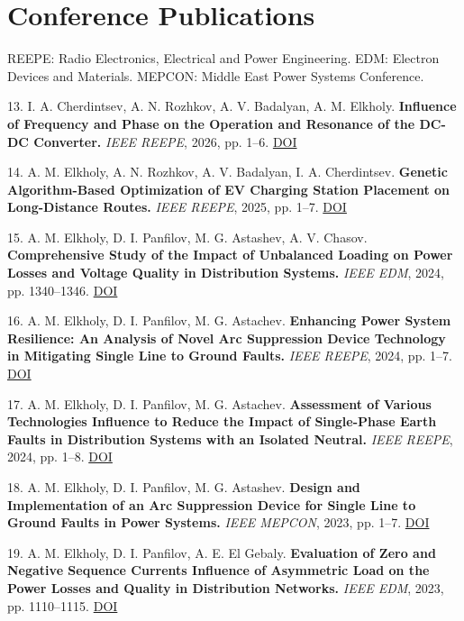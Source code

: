 \documentclass[10pt,a4paper]{article}
\begin{document}
\section*{Conference Publications}
REEPE: Radio Electronics, Electrical and Power Engineering. EDM: Electron Devices and Materials. MEPCON: Middle East Power Systems Conference.\par
13. I. A. Cherdintsev, A. N. Rozhkov, A. V. Badalyan, A. M. Elkholy. \textbf{Influence of Frequency and Phase on the Operation and Resonance of the DC-DC Converter.} \textit{IEEE REEPE}, 2026, pp. 1–6. \href{https://doi.org/10.1109/reepe69046.2026.11481435}{DOI}\par
14. A. M. Elkholy, A. N. Rozhkov, A. V. Badalyan, I. A. Cherdintsev. \textbf{Genetic Algorithm-Based Optimization of EV Charging Station Placement on Long-Distance Routes.} \textit{IEEE REEPE}, 2025, pp. 1–7. \href{https://doi.org/10.1109/reepe63962.2025.10970891}{DOI}\par
15. A. M. Elkholy, D. I. Panfilov, M. G. Astashev, A. V. Chasov. \textbf{Comprehensive Study of the Impact of Unbalanced Loading on Power Losses and Voltage Quality in Distribution Systems.} \textit{IEEE EDM}, 2024, pp. 1340–1346. \href{https://doi.org/10.1109/edm61683.2024.10615221}{DOI}\par
16. A. M. Elkholy, D. I. Panfilov, M. G. Astachev. \textbf{Enhancing Power System Resilience: An Analysis of Novel Arc Suppression Device Technology in Mitigating Single Line to Ground Faults.} \textit{IEEE REEPE}, 2024, pp. 1–7. \href{https://doi.org/10.1109/reepe60449.2024.10479781}{DOI}\par
17. A. M. Elkholy, D. I. Panfilov, M. G. Astachev. \textbf{Assessment of Various Technologies Influence to Reduce the Impact of Single-Phase Earth Faults in Distribution Systems with an Isolated Neutral.} \textit{IEEE REEPE}, 2024, pp. 1–8. \href{https://doi.org/10.1109/reepe60449.2024.10479818}{DOI}\par
18. A. M. Elkholy, D. I. Panfilov, M. G. Astashev. \textbf{Design and Implementation of an Arc Suppression Device for Single Line to Ground Faults in Power Systems.} \textit{IEEE MEPCON}, 2023, pp. 1–7. \href{https://doi.org/10.1109/mepcon58725.2023.10462330}{DOI}\par
19. A. M. Elkholy, D. I. Panfilov, A. E. El Gebaly. \textbf{Evaluation of Zero and Negative Sequence Currents Influence of Asymmetric Load on the Power Losses and Quality in Distribution Networks.} \textit{IEEE EDM}, 2023, pp. 1110–1115. \href{https://doi.org/10.1109/edm58354.2023.10225208}{DOI}\par
\end{document}
